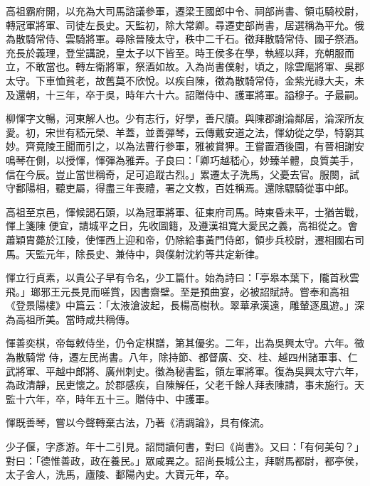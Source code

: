 \begin{pinyinscope}
 高祖霸府開，以充為大司馬諮議參軍，遷梁王國郎中令、祠部尚書、領屯騎校尉，轉冠軍將軍、司徒左長史。天監初，除大常卿。尋遷吏部尚書，居選稱為平允。俄為散騎常侍、雲騎將軍。尋除晉陵太守，秩中二千石。徵拜散騎常侍、國子祭酒。充長於義理，登堂講說，皇太子以下皆至。時王侯多在學，執經以拜，充朝服而立，不敢當也。轉左衛將軍，祭酒如故。入為尚書僕射，頃之，除雲麾將軍、吳郡太守。下車恤貧老，故舊莫不欣悅。以疾自陳，徵為散騎常侍，金紫光祿大夫，未及還朝，十三年，卒于吳，時年六十六。詔贈侍中、護軍將軍。謚穆子。子最嗣。



 柳惲字文暢，河東解人也。少有志行，好學，善尺牘。與陳郡謝淪鄰居，淪深所友愛。初，宋世有嵇元榮、羊蓋，並善彈琴，云傳戴安道之法，惲幼從之學，特窮其妙。齊竟陵王聞而引之，以為法曹行參軍，雅被賞狎。王嘗置酒後園，有晉相謝安鳴琴在側，以授惲，惲彈為雅弄。子良曰：「卿巧越嵇心，妙臻羊體，良質美手，信在今辰。豈止當世稱奇，足可追蹤古烈。」累遷太子洗馬，父憂去官。服闋，試守鄱陽相，聽吏屬，得盡三年喪禮，署之文教，百姓稱焉。還除驃騎從事中郎。



 高祖至京邑，惲候謁石頭，以為冠軍將軍、征東府司馬。時東昏未平，士猶苦戰，惲上箋陳
 便宜，請城平之日，先收圖籍，及遵漢祖寬大愛民之義，高祖從之。會蕭穎胄薨於江陵，使惲西上迎和帝，仍除給事黃門侍郎，領步兵校尉，遷相國右司馬。天監元年，除長史、兼侍中，與僕射沈約等共定新律。



 惲立行貞素，以貴公子早有令名，少工篇什。始為詩曰：「亭皋本葉下，隴首秋雲飛。」瑯邪王元長見而嗟賞，因書齋壁。至是預曲宴，必被詔賦詩。嘗奉和高祖《登景陽樓》中篇云：「太液滄波起，長楊高樹秋。翠華承漢遠，雕輦逐風遊。」深為高祖所美。當時咸共稱傳。



 惲善奕棋，帝每敕侍坐，仍令定棋譜，第其優劣。二年，出為吳興太守。六年。徵為散騎常
 侍，遷左民尚書。八年，除持節、都督廣、交、桂、越四州諸軍事、仁武將軍、平越中郎將、廣州刺史。徵為秘書監，領左軍將軍。復為吳興太守六年，為政清靜，民吏懷之。於郡感疾，自陳解任，父老千餘人拜表陳請，事未施行。天監十六年，卒，時年五十三。贈侍中、中護軍。



 惲既善琴，嘗以今聲轉棄古法，乃著《清調論》，具有條流。



 少子偃，字彥游。年十二引見。詔問讀何書，對曰《尚書》。又曰：「有何美句？」對曰：「德惟善政，政在養民。」眾咸異之。詔尚長城公主，拜駙馬都尉，都亭侯，太子舍人，洗馬，廬陵、鄱陽內史。大寶元年，卒。




\end{pinyinscope}

